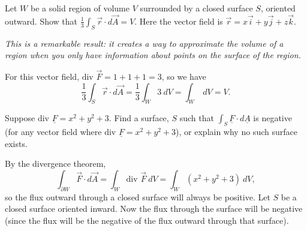 \documentclass[12pt,letterpaper,noanswers]{exam}
\begin{document}
\begin{questions}







\question 
\begin{parts}
\item Let $W$ be a solid region of volume $V$ surrounded by a closed surface $S$, oriented outward.  Show that $\displaystyle \frac{1}{3}\int_S \vec r\cdot d\vec A = V$.  Here the vector field is $\vec r = x\vec i + y\vec j + z\vec k$.  

\emph{This is a remarkable result: it creates a way to approximate the volume of a region when you only have information about points on the surface of the region.}
\begin{solution}
For this vector field, $\text{div }\vec F = 1 + 1 + 1 = 3$, so we have \[\frac{1}{3}\int_S\vec r\cdot d\vec A = \frac{1}{3}\int_W 3\ dV = \int_W \ dV = V.\]
\end{solution}
\item Suppose $\text{div }\underline F = x^2+y^2+3$.  Find a surface, $S$ such that $\int_S\underline F\cdot d\underline A$ is negative (for any vector field where $\text{div }\underline F = x^2+y^2+3$), or explain why no such surface exists.
\begin{solution}
By the divergence theorem,
\[\int_{\partial W} \vec F \cdot d\vec A = \int_W \text{div }\vec F\ dV = \int_W (x^2+y^2+3)\ dV,\] so the flux outward through a closed surface will always be positive.  Let $S$ be a closed surface oriented inward.  Now the flux through the surface will be negative (since the flux will be the negative of the flux outward through that surface).
\end{solution}
\end{parts}


\end{questions}
\end{document}
